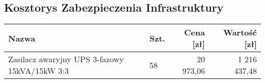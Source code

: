     

\subsection{Kosztorys Zabezpieczenia Infrastruktury}
\begin{flushleft}
    \begin{table}[h]
        \renewcommand{\arraystretch}{1.5}
        \begin{tabular}{|l|l|r|r|}
            \hline
            \textbf{Nazwa} & \textbf{Szt.} & \textbf{Cena [zł]} & \textbf{Wartość [zł]} \\
            \hline
            Zasilacz awaryjny UPS 3-fazowy 15kVA/15kW 3:3 & 58 & 20 973,06 & 1 216 437,48 \\
            \hline
        \end{tabular}
    \end{table}
\end{flushleft}

